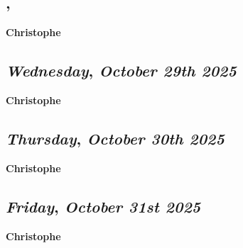 \subsection*{\weekday, \day}
\textbf {Christophe}

\def\day{\textit{October 29th 2025}}
\def\weekday{\textit{Wednesday}}
\subsection*{\weekday, \day}
\textbf {Christophe}

\def\day{\textit{October 30th 2025}}
\def\weekday{\textit{Thursday}}
\subsection*{\weekday, \day}
\textbf {Christophe}

\def\day{\textit{October 31st 2025}}
\def\weekday{\textit{Friday}}
\subsection*{\weekday, \day}
\textbf {Christophe}
